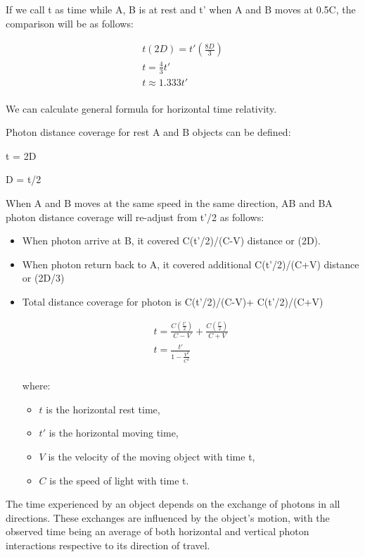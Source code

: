 \documentclass{article}
\begin{document}
    If we call t as time while A, B is at rest and t' when A and B moves at 0.5C, the comparison will be as follows:

    \begin{gather*}
        t(2D) = t'\left(\frac{8D}{3}\right)\\
        t = \frac{4}{3} t'\\
        t \approx 1.333 t'\\
    \end{gather*}


    We can calculate general formula for horizontal time relativity.

    Photon distance coverage for rest A and B objects can be defined:

    t = 2D

    D = t/2

    When A and B moves at the same speed in the same direction, AB and BA photon distance coverage will re-adjust from t'/2 as follows:
    \begin{itemize}
        \item When photon arrive at B, it covered C(t'/2)/(C-V) distance or (2D).
        \item When photon return back to A, it covered additional C(t'/2)/(C+V) distance or (2D/3)
        \item Total distance coverage for photon is C(t'/2)/(C-V)+ C(t'/2)/(C+V)

        \begin{gather*}
            t = \frac{C \left( \frac{t'}{2} \right)}{C - V} + \frac{C \left( \frac{t'}{2} \right)}{C + V}\\
            t = \frac{t'}{1 - \frac{V^2}{C^2}}\\
        \end{gather*}

        where:
        \begin{itemize}
            \item \( t \) is the horizontal rest time,
            \item \( t' \) is the horizontal moving time,
            \item \( V \) is the velocity of the moving object with time t,
            \item \( C \) is the speed of light with time t.
        \end{itemize}

    \end{itemize}

    The time experienced by an object depends on the exchange of photons in all directions.
    These exchanges are influenced by the object’s motion, with the observed time being an average of both horizontal and vertical photon interactions respective to its direction of travel.
\end{document}
